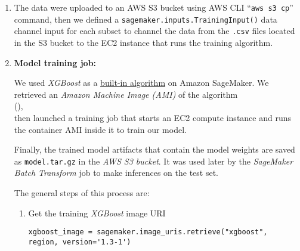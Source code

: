\documentclass[a4paper]{article}
\begin{document}
{\begin{enumerate}
      
      \begin{enumerate}
      \item The \emph{training} dataset is loaded from \texttt{Udacity\_MAILOUT\_052018\_TRAIN.csv} in a pandas dataframe, then it is passed through the pipeline's  method. The \emph{testing} dataset is loaded from \texttt{Udacity\_MAILOUT\_052018\_TEST.csv} and passed through the fitted pipeline's  method.
      \item The training dataset is split into 80\% \emph{train}  subset and 20\% \emph{validation} subset.
      \item The transformed \emph{train}, \emph{test}, and \emph{validation} datasets are saved to \texttt{.csv} files that are compatible with Amazon SageMaker built-in algorithms. The first column is the label and the \texttt{.csv} file has no column headers.
      \end{enumerate}
    \item The data were uploaded to an AWS S3 bucket using AWS CLI  ``\texttt{aws s3 cp}'' command, then we defined a \texttt{sagemaker.inputs.TrainingInput()} data channel input for each subset to channel the data from the \texttt{.csv} files located in the S3 bucket to the EC2 instance that runs the training algorithm.
    \item \textbf{Model training job:}

      We used \emph{XGBoost} as a \href{https://docs.aws.amazon.com/sagemaker/latest/dg/xgboost.html}{built-in algorithm} on Amazon SageMaker.
      We retrieved an \emph{Amazon Machine Image (AMI)} of the algorithm\\
      (),\\
      then launched a training job that starts an  EC2 compute instance and runs the container AMI inside it to train our model.

      Finally, the trained model artifacts that contain the model weights are saved as \texttt{model.tar.gz} in the \emph{AWS S3 bucket}. It was used later by the \emph{SageMaker Batch Transform} job to make inferences on the test set.

      \pagebreak
      The general steps of this process are:
      
      \begin{enumerate}
      \item Get the training \emph{XGBoost} image URI
        \begin{verbatim}
xgboost_image = sagemaker.image_uris.retrieve("xgboost", region, version='1.3-1')
          \end{verbatim}


\end{enumerate}
\end{enumerate}}
\end{document}
